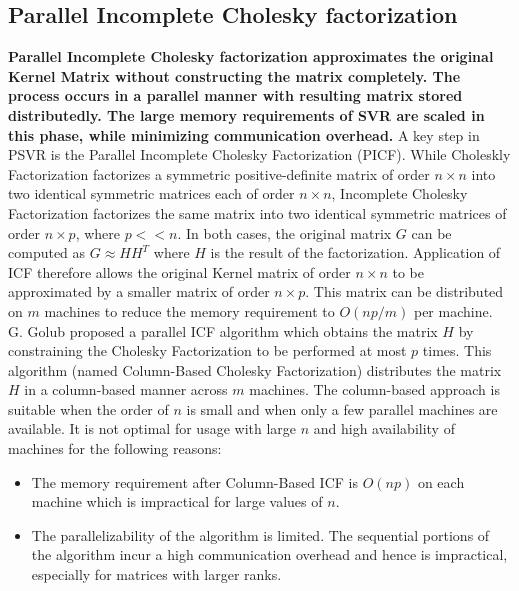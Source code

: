 \documentclass[12pt]{article}
\begin{document}
 \subsection{Parallel Incomplete Cholesky factorization}
 \label{Parallel Incomplete Cholesky factorization}
  {\bf Parallel Incomplete Cholesky factorization approximates the original Kernel Matrix without constructing the matrix completely. The process occurs in a parallel manner with resulting matrix stored distributedly. The large memory requirements of SVR are scaled in this phase, while minimizing communication overhead.}
  \newline
A key step in PSVR is the Parallel Incomplete Cholesky Factorization (PICF). While Choleskly Factorization factorizes a symmetric positive-definite matrix of order $n \times n$ into two  identical symmetric matrices each of order $n \times n$, Incomplete Cholesky Factorization factorizes the same matrix into two identical symmetric matrices of order $n \times p$, where $p << n$. In both cases, the original matrix $G$ can be computed as $G \approx HH^T$ where $H$ is the result of the factorization.
 \newline
 \newline
Application of ICF therefore allows the original Kernel matrix  of order $n \times n$ to be approximated by a smaller matrix of order  $n \times p$. This matrix can be distributed on $m$ machines to reduce the memory requirement to $O(np/m)$ per machine.
 \newline \newline
 G. Golub proposed a parallel ICF algorithm which obtains the matrix $H$ by constraining the Cholesky Factorization to be performed at most $p$ times. This algorithm (named Column-Based Cholesky Factorization) distributes the matrix $H$ in a column-based manner across $m$ machines. The column-based approach is suitable when the order of $n$ is small and when only a few parallel machines are available. It is not optimal for usage with large $n$ and high availability of machines for the following reasons:
\begin{itemize}
\item The memory requirement after Column-Based ICF is $O(np)$ on each machine which is impractical for large values of $n$.
\item The parallelizability of the algorithm is limited. The sequential portions of the algorithm incur a high communication overhead and hence is impractical, especially for matrices with larger ranks. 
\end{itemize}
\end{document}
